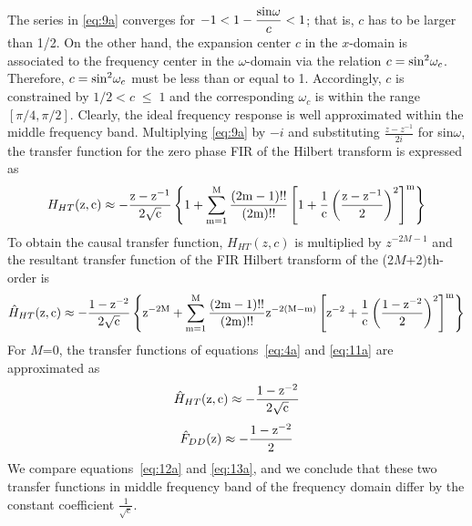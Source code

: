 The series in \ref{eq:9a} converges for $\displaystyle
-1<1-\frac{{\rm{sin}}\omega}{c}<1$; that is, $c$ has to be larger than
1/2. On the other hand, the expansion center $c$ in the $x$-domain is
associated to the frequency center in the $\omega$-domain via the
relation $c={\rm{sin}}^2\omega_c$. Therefore, $c={\rm{sin}}^2\omega_c$
must be less than or equal to 1. Accordingly, $c$ is constrained by
$1/2<c\;{\leq}\;1$ and the corresponding $\omega_c$ is within the
range $[\pi/4,\pi/2]$. Clearly, the ideal frequency response is well
approximated within the middle frequency band. Multiplying \ref{eq:9a}
by $- i$ and substituting $\displaystyle\frac{z-z^{-1}}{2i}$ for
sin$\omega$, the transfer function for the zero phase FIR of the
Hilbert transform is expressed as
\begin{equation}
\label{eq:10a}
H_{HT}\rm{(z,c)}\approx-\frac{z-z^{-1}}{2\sqrt{c}}
    \left\{1+\sum_{m=1}^{M}\frac{(2m-1)!!}{(2m)!!}\left[1+\frac{1}{c} 
    \left( \frac{z-z^{-1}}{2} \right)^2\right]^m \right\}
\end{equation}
To obtain the causal transfer function, $H_{HT}(z,c)$ is
multiplied by $z^{-2M-1}$ and the resultant transfer function of
the FIR Hilbert transform of the (2$M$+2)th-order is
\begin{equation}
\label{eq:11a}
\hat{H}_{HT}\rm{(z,c)}\approx-\frac{1-z^{-2}}{2\sqrt{c}}
   \left\{z^{-2M}+\sum_{m=1}^{M}\frac{(2m-1)!!}{(2m)!!}z^{-2(M-m)}
    \left[z^{-2}+\frac{1}{c} \left( \frac{1-z^{-2}}{2} 
     \right)^2\right]^m \right\}
\end{equation}
For $M$=0, the transfer functions of equations~\ref{eq:4a}
and \ref{eq:11a} are approximated as
\begin{equation}
\label{eq:12a}
\hat{H}_{HT}\rm{(z,c)}\approx-\frac{1-z^{-2}}{2\sqrt{c}}
\end{equation}
\begin{equation}
\label{eq:13a}
\hat{F}_{DD}\rm{(z)}\approx-\frac{1-z^{-2}}{2}
\end{equation}
We compare equations~\ref{eq:12a} and \ref{eq:13a}, and we conclude
that these two transfer functions in middle frequency band of the
frequency domain differ by the constant coefficient
$\displaystyle\frac{1}{\sqrt{c}}$.



